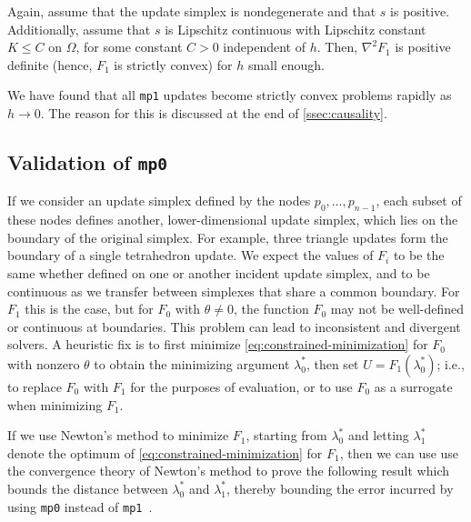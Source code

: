 \documentclass[sisc-eikonal.tex]{subfiles}
\begin{document}
\begin{lemma}\label{lemma:F-strictly-convex}
  Again, assume that the update simplex is nondegenerate and that $s$
  is positive. Additionally, assume that $s$ is Lipschitz continuous
  with Lipschitz constant $K \leq C$ on $\Omega$, for some constant
  $C > 0$ independent of $h$. Then, $\nabla^2 F_1$ is positive
  definite (hence, $F_1$ is strictly convex) for $h$ small enough.
\end{lemma}

We have found that all \texttt{mp1} updates become strictly convex
problems rapidly as $h \to 0$. The reason for this is discussed at the
end of \cref{ssec:causality}.

\subsection{Validation of \texttt{mp0}}\label{ssec:validation}

If we consider an update simplex defined by the nodes
$p_0, \hdots, p_{n-1}$, each subset of these nodes defines another,
lower-dimensional update simplex, which lies on the boundary of the
original simplex. For example, three triangle updates form the
boundary of a single tetrahedron update. We expect the values of $F_i$
to be the same whether defined on one or another incident update
simplex, and to be continuous as we transfer between simplexes that
share a common boundary. For $F_1$ this is the case, but for $F_0$
with $\theta \neq 0$, the function $F_0$ may not be well-defined or
continuous at boundaries. This problem can lead to inconsistent and
divergent solvers. A heuristic fix is to first minimize
\cref{eq:constrained-minimization} for $F_0$ with nonzero $\theta$ to
obtain the minimizing argument $\lambda^*_0$, then set
$\hat{U} = F_1(\lambda_0^*)$; i.e., to replace $F_0$ with $F_1$ for
the purposes of evaluation, or to use $F_0$ as a surrogate when
minimizing $F_1$.

If we use Newton's method to minimize $F_1$, starting from
$\lambda_0^*$ and letting $\lambda_1^*$ denote the optimum of
\cref{eq:constrained-minimization} for $F_1$, then we can use use the
convergence theory of Newton's method to prove the following result
which bounds the distance between $\lambda_0^*$ and $\lambda_1^*$,
thereby bounding the error incurred by using \texttt{mp0} instead of
\texttt{mp1}~\cite{stoer2013introduction}.
\end{document}
